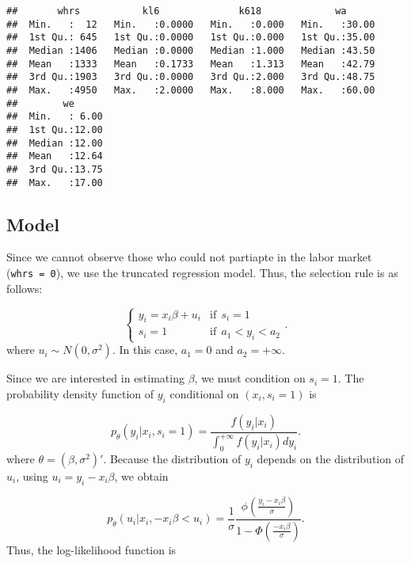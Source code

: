 \documentclass[
  12pt,
]{article}
\begin{document}
\begin{verbatim}
##       whrs           kl6              k618             wa       
##  Min.   :  12   Min.   :0.0000   Min.   :0.000   Min.   :30.00  
##  1st Qu.: 645   1st Qu.:0.0000   1st Qu.:0.000   1st Qu.:35.00  
##  Median :1406   Median :0.0000   Median :1.000   Median :43.50  
##  Mean   :1333   Mean   :0.1733   Mean   :1.313   Mean   :42.79  
##  3rd Qu.:1903   3rd Qu.:0.0000   3rd Qu.:2.000   3rd Qu.:48.75  
##  Max.   :4950   Max.   :2.0000   Max.   :8.000   Max.   :60.00  
##        we       
##  Min.   : 6.00  
##  1st Qu.:12.00  
##  Median :12.00  
##  Mean   :12.64  
##  3rd Qu.:13.75  
##  Max.   :17.00
\end{verbatim}

\hypertarget{model}{%
\subsection{Model}\label{model}}

Since we cannot observe those who could not partiapte in the labor
market (\texttt{whrs\ =\ 0}), we use the truncated regression model.
Thus, the selection rule is as follows:

\begin{equation*}
  \begin{cases}
    y_i = x_i \beta + u_i &\text{if}\:\: s_i = 1  \\
    s_i = 1 &\text{if}\:\: a_1 < y_i < a_2
  \end{cases}.
\end{equation*} where \(u_i \sim N(0, \sigma^2)\). In this case,
\(a_1 = 0\) and \(a_2 = +\infty\).

Since we are interested in estimating \(\beta\), we must condition on
\(s_i = 1\). The probability density function of \(y_i\) conditional on
\((x_i, s_i = 1)\) is

\begin{equation*}
  p_{\theta}(y_i | x_i, s_i = 1) = \frac{f(y_i | x_i)}{\int_0^{+\infty} f(y_i | x_i) dy_i}.
\end{equation*} where \(\theta = (\beta, \sigma^2)'\). Because the
distribution of \(y_i\) depends on the distribution of \(u_i\), using
\(u_i = y_i - x_i \beta\), we obtain

\begin{equation*}
  p_{\theta}(u_i | x_i, -x_i \beta < u_i) 
  = \frac{1}{\sigma} \frac{\phi(\frac{y_i - x_i \beta}{\sigma})}{1 - \Phi(\frac{- x_i \beta}{\sigma})}.
\end{equation*} Thus, the log-likelihood function is
\end{document}
